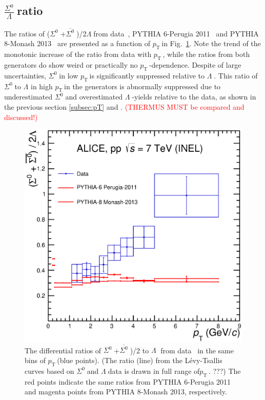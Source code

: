 \documentclass[ALICE,manyauthors]{cernphprep}
\newcommand{\siglam}{\ensuremath{\frac{\Sigma^0}{\Lambda} \; }}
\newcommand{\sig}{\ensuremath{\Sigma^0  \; }}
\newcommand{\asig}{\ensuremath{\overline{\Sigma^0} \; }}
\newcommand{\lam}{\ensuremath{\Lambda \; }}
\newcommand{\pt}{\ensuremath{p_{\mathrm{T}\; }}}
\newcommand{\red}{\textcolor{red}}
\begin{document}
 \subsection{\siglam ratio}  
\label{subsec:diff_ratio}

The ratios of (\sig+\asig)/2\lam from data~\cite{cite:ALICE-LF}, PYTHIA 6-Perugia 2011~\cite{cite:pythia6} 
and PYTHIA 8-Monash 2013~\cite{cite:PYTHIA-8-Monash-gener} are presented as a function of \pt in 
Fig.~\ref{fig:siglam-ptdepratio}. Note the trend of the monotonic increase of the ratio from data with \pt,
while the ratios from both generators do show weird or practically no \pt-dependence.
Despite of large uncertainties, \sig in low \pt is significantly suppressed relative to \lam. This ratio of \sig to $\Lambda$
in high \pt in the generators is abnormally suppressed due to underestimated \sig and overestimated \lam-yields relative to
the data, as shown in the previous section \ref{subsec:pT} and \cite{cite:ALICE-LF}. 
\red{(THERMUS MUST be compared and discussed!)} \\

\begin{figure}[h!]
  \centering

   \includegraphics[width=10.cm]{Figure/ratio-Sigma0Lambda-7mar18.eps}

    \caption{ The differential ratios of \sig+\asig)/2 to \lam 
    from data~\cite{cite:ALICE-LF}  in the same bins of \pt (blue points). (The ratio (line) from the L\'{e}vy-Tsallis 
     curves based on \sig and \lam data is drawn     in full range of\pt. ???)
 The red points indicate the same ratios from PYTHIA 6-Perugia 2011 and magenta points from PYTHIA 8-Monash 2013, 
    respectively.
}
    \label{fig:siglam-ptdepratio}
\end{figure}
\end{document}
